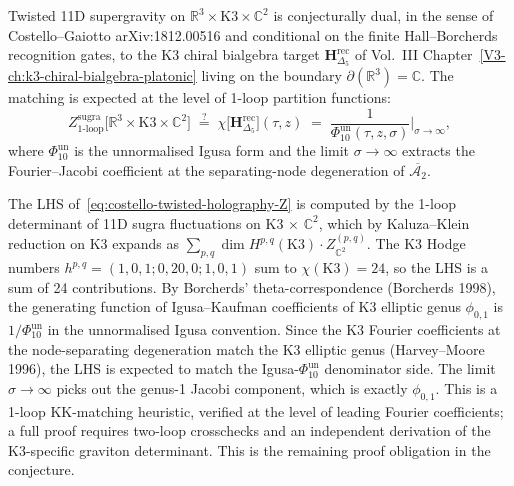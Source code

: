 \begin{conjecture}
\label{conj:costello-twisted-holography-matching}
Twisted 11D supergravity on
$\mathbb{R}^3 \times \mathrm{K3} \times \mathbb{C}^2$
is conjecturally dual, in the sense of Costello--Gaiotto
arXiv:1812.00516 and conditional on the finite Hall--Borcherds
recognition gates, to the K3 chiral bialgebra target
$\mathbf{H}_{\Delta_5}^{\mathrm{rec}}$ of Vol.~III
Chapter~\ref{V3-ch:k3-chiral-bialgebra-platonic} living on the
boundary $\partial(\mathbb{R}^3) = \mathbb{C}$. The matching is
expected at the level of 1-loop partition functions:
\begin{equation}
\label{eq:costello-twisted-holography-Z}
Z^{\mathrm{sugra}}_{1\text{-loop}}
 \bigl[\mathbb{R}^3\times\mathrm{K3}\times\mathbb{C}^2\bigr]
\;\stackrel{?}{=}\;
\chi\bigl[\mathbf{H}_{\Delta_5}^{\mathrm{rec}}\bigr](\tau,z)
\;=\;
\frac{1}{\Phi_{10}^{\mathrm{un}}(\tau,z,\sigma)}\bigg|_{\sigma\to\infty},
\end{equation}
where $\Phi_{10}^{\mathrm{un}}$ is the unnormalised Igusa form and the limit
$\sigma\to\infty$ extracts the Fourier--Jacobi coefficient at
the separating-node degeneration of $\overline{\mathcal{A}_2}$.
\end{conjecture}

\begin{remark}
\label{rem:costello-twisted-holography-heuristic}
The LHS of~\eqref{eq:costello-twisted-holography-Z} is
computed by the 1-loop determinant of 11D sugra fluctuations
on K3 $\times$ $\mathbb{C}^2$, which by Kaluza--Klein reduction on
K3 expands as
$\sum_{p,q} \dim H^{p,q}(\mathrm{K3}) \cdot Z^{(p,q)}_{\mathbb{C}^2}$.
The K3 Hodge numbers $h^{p,q} = (1,0,1;0,20,0;1,0,1)$ sum to
$\chi(\mathrm{K3}) = 24$, so the LHS is a sum of 24 contributions.
By Borcherds' theta-correspondence (Borcherds 1998), the
generating function of Igusa--Kaufman coefficients of K3 elliptic
genus $\phi_{0,1}$ is $1/\Phi_{10}^{\mathrm{un}}$ in the
unnormalised Igusa convention. Since the K3 Fourier
coefficients at the node-separating degeneration match the
K3 elliptic genus (Harvey--Moore 1996), the LHS is expected to
match the Igusa-$\Phi_{10}^{\mathrm{un}}$ denominator side. The limit
$\sigma\to\infty$ picks out the genus-1 Jacobi component, which
is exactly $\phi_{0,1}$. This is a 1-loop KK-matching
heuristic, verified at the level of leading Fourier
coefficients; a full proof requires two-loop crosschecks
and an independent derivation of the K3-specific graviton
determinant. This is the remaining proof obligation in the conjecture.
\end{remark}

